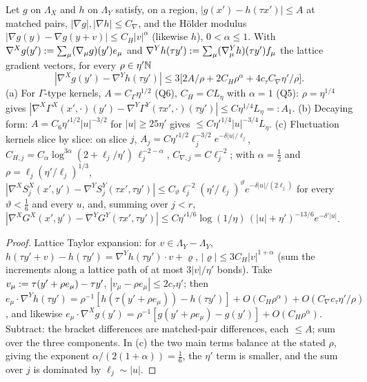 \begin{lemma}\label{rot:lem:CK2}
Let $g$ on $\Lambda_X$ and $h$ on $\Lambda_Y$ satisfy, on a region, $|g(x')-h(\tau x')|\le A$ at matched pairs, $|\nabla g|,|\nabla h|\le C_\nabla$, and the H\"older modulus $|\nabla g(y)-\nabla g(y+v)|\le C_H|v|^\alpha$ (likewise $h$), $0<\alpha\le1$. With $\nabla^Xg(y'):=\sum_\mu(\nabla_\mu g)(y')e_\mu$ and $\nabla^Yh(\tau y'):=\sum_\mu(\nabla^Y_\mu h)(\tau y')f_\mu$ the lattice gradient vectors, for every $\rho\in\eta'\mathbb N$
\[
|\nabla^Xg(y')-\nabla^Yh(\tau y')|\le3\big[2A/\rho+2C_H\rho^\alpha+4c_\tau C_\nabla\eta'/\rho\big].
\]
\textup{(a)} For $\Gamma$-type kernels, $A=C_\Gamma\eta^{1/2}$ (Q6), $C_H=CL_\eta$ with $\alpha=1$ (Q5): $\rho=\eta^{1/4}$ gives $|\nabla^X\Gamma^X(x',\cdot)(y')-\nabla^Y\Gamma^Y(\tau x',\cdot)(\tau y')|\le C\eta^{1/4}L_\eta=:A_1$. \textup{(b)} Decaying form: $A=C_6\eta'^{1/2}|u|^{-3/2}$ for $|u|\ge25\eta'$ gives $\le C\eta'^{1/4}|u|^{-3/4}L_\eta$. \textup{(c)} Fluctuation kernels slice by slice: on slice $j$, $A_j=C\eta'^{1/2}\ell_j^{-3/2}e^{-\delta|u|/\ell_j}$, $C_{H,j}=C_\alpha\log^{3\alpha}(2+\ell_j/\eta')\,\ell_j^{-2-\alpha}$, $C_{\nabla,j}=C\ell_j^{-2}$; with $\alpha=\frac12$ and $\rho=\ell_j(\eta'/\ell_j)^{1/3}$, $|\nabla^XS^X_j(x',y')-\nabla^YS^Y_j(\tau x',\tau y')|\le C_\vartheta\ell_j^{-2}(\eta'/\ell_j)^{\vartheta}e^{-\delta|u|/(2\ell_j)}$ for every $\vartheta<\frac16$ and every $u$, and, summing over $j<r$, $|\nabla^XG^X(x',y')-\nabla^YG^Y(\tau x',\tau y')|\le C\eta'^{1/6}\log(1/\eta)\,(|u|+\eta')^{-13/6}e^{-\delta'|u|}$.
\end{lemma}
\begin{proof}
Lattice Taylor expansion: for $v\in\Lambda_Y-\Lambda_Y$, $h(\tau y'+v)-h(\tau y')=\nabla^Yh(\tau y')\cdot v+\varrho$, $|\varrho|\le3C_H|v|^{1+\alpha}$ (sum the increments along a lattice path of at most $3|v|/\eta'$ bonds). Take $v_\mu:=\tau(y'+\rho e_\mu)-\tau y'$, $|v_\mu-\rho e_\mu|\le2c_\tau\eta'$; then $e_\mu\cdot\nabla^Yh(\tau y')=\rho^{-1}[h(\tau(y'+\rho e_\mu))-h(\tau y')]+O(C_H\rho^\alpha)+O(C_\nabla c_\tau\eta'/\rho)$, and likewise $e_\mu\cdot\nabla^Xg(y')=\rho^{-1}[g(y'+\rho e_\mu)-g(y')]+O(C_H\rho^\alpha)$. Subtract: the bracket differences are matched-pair differences, each $\le A$; sum over the three components. In (c) the two main terms balance at the stated $\rho$, giving the exponent $\alpha/(2(1+\alpha))=\frac16$, the $\eta'$ term is smaller, and the sum over $j$ is dominated by $\ell_j\sim|u|$.
\end{proof}
